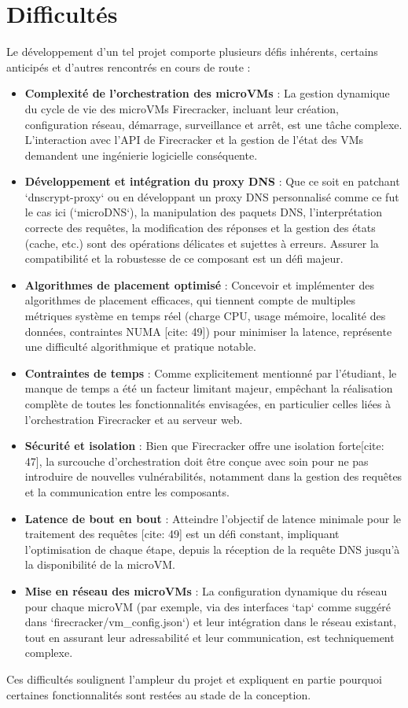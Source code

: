 \documentclass[12pt]{article}
\begin{document}
\section{Difficultés}
Le développement d'un tel projet comporte plusieurs défis inhérents, certains anticipés et d'autres rencontrés en cours de route :

\begin{itemize}
    \item \textbf{Complexité de l'orchestration des microVMs} : La gestion dynamique du cycle de vie des microVMs Firecracker, incluant leur création, configuration réseau, démarrage, surveillance et arrêt, est une tâche complexe. L'interaction avec l'API de Firecracker et la gestion de l'état des VMs demandent une ingénierie logicielle conséquente.
    \item \textbf{Développement et intégration du proxy DNS} : Que ce soit en patchant `dnscrypt-proxy` ou en développant un proxy DNS personnalisé comme ce fut le cas ici (`microDNS`), la manipulation des paquets DNS, l'interprétation correcte des requêtes, la modification des réponses et la gestion des états (cache, etc.) sont des opérations délicates et sujettes à erreurs. Assurer la compatibilité et la robustesse de ce composant est un défi majeur.
    \item \textbf{Algorithmes de placement optimisé} : Concevoir et implémenter des algorithmes de placement efficaces, qui tiennent compte de multiples métriques système en temps réel (charge CPU, usage mémoire, localité des données, contraintes NUMA [cite: 49]) pour minimiser la latence, représente une difficulté algorithmique et pratique notable.
    \item \textbf{Contraintes de temps} : Comme explicitement mentionné par l'étudiant, le manque de temps a été un facteur limitant majeur, empêchant la réalisation complète de toutes les fonctionnalités envisagées, en particulier celles liées à l'orchestration Firecracker et au serveur web.
    \item \textbf{Sécurité et isolation} : Bien que Firecracker offre une isolation forte[cite: 47], la surcouche d'orchestration doit être conçue avec soin pour ne pas introduire de nouvelles vulnérabilités, notamment dans la gestion des requêtes et la communication entre les composants.
    \item \textbf{Latence de bout en bout} : Atteindre l'objectif de latence minimale pour le traitement des requêtes [cite: 49] est un défi constant, impliquant l'optimisation de chaque étape, depuis la réception de la requête DNS jusqu'à la disponibilité de la microVM.
    \item \textbf{Mise en réseau des microVMs} : La configuration dynamique du réseau pour chaque microVM (par exemple, via des interfaces `tap` comme suggéré dans `firecracker/vm_config.json`) et leur intégration dans le réseau existant, tout en assurant leur adressabilité et leur communication, est techniquement complexe.
\end{itemize}
Ces difficultés soulignent l'ampleur du projet et expliquent en partie pourquoi certaines fonctionnalités sont restées au stade de la conception.
\end{document}
